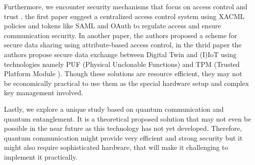 Furthermore, we encounter security mechanisms that focus on access control and trust \cite{gehrmannDigitalTwinBased2020, chengzhelaiSPDTSecurePrivacyPreserving2022, debenedictisAdoptionSecureCyber2022}. the first paper suggest a centralized access control system using XACML policies and tokens like SAML and OAuth to regulate access and ensure communication security. In another paper, the authors proposed a scheme for secure data sharing using attribute-based access control, in the thrid paper the authors propose secure data exchange between Digital Twin and (I)IoT using technologies namely PUF (Physical Unclonable Functions) and TPM (Trusted Platform Module ). Though these solutions are resource efficient, they may not be economically practical to use them as the special hardware setup and complex key management involved. 


Lastly, we explore a unique study \cite{lvDigitalTwinsBased2022} based on quantum communication and quantum entanglement. It is a theoretical proposed solution that may not even be possible in the near future as this technology has not yet developed. Therefore, quantum communication might provide very efficient and strong security but it might also require sophisticated hardware, that will make it challenging to implement it practically. 



